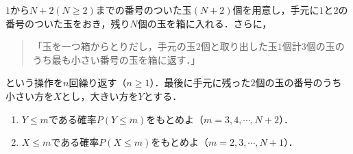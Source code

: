 \documentclass[../../main.tex]{subfiles}
\begin{document}
$1$から$N+2 (N\ge 2)$までの番号のついた玉$(N+2)$個を用意し，手元に$1$と$2$の番号のついた玉をおき，残り$N$個の玉を箱に入れる．さらに，
\begin{quote}
  「玉を一つ箱からとりだし，手元の玉$2$個と取り出した玉$1$個計$3$個の玉のうち最も小さい番号の玉を箱に返す．」
\end{quote}
という操作を$n$回繰り返す（$n\ge 1$）．最後に手元に残った$2$個の玉の番号のうち小さい方を$X$とし，大きい方を$Y$とする．
\begin{enumerate}
  \item $Y\le m$である確率$P (Y\le m)$をもとめよ（$m=3,4,\cdots, N+2$）．
  \item $X\le m$である確率$P (X\le m)$をもとめよ（$m=2,3,\cdots, N+1$）．
\end{enumerate}
\end{document}
